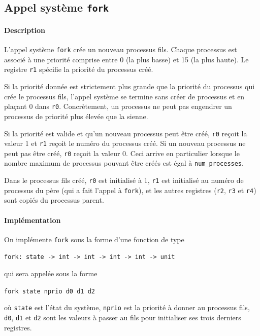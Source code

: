 \documentclass[french, toc]{../cs-classes/cs-classes}
\begin{document}
\subsection{Appel système \texttt{fork}}
\paragraph*{Description}
L'appel système \texttt{fork} crée un nouveau processus fils. Chaque processus est associé à une priorité comprise entre 0 (la plus basse) et 15 (la plus haute). Le registre \texttt{r1} spécifie la priorité du processus créé. 

Si la priorité donnée est strictement plus grande que la priorité du processus qui crée le processus fils, l’appel système se termine sans créer de processus et en plaçant 0 dans \texttt{r0}. Concrètement, un processus ne peut pas engendrer un processus de priorité plus élevée que la sienne. 

Si la priorité est valide et qu’un nouveau processus peut être créé, \texttt{r0} reçoit la valeur 1 et \texttt{r1} reçoit le numéro du processus créé. Si un nouveau processus ne peut pas être créé, \texttt{r0} reçoit la valeur 0. Ceci arrive en particulier lorsque le nombre maximum de processus pouvant être créés est égal à \texttt{num\_processes}.

Dans le processus ﬁls créé, \texttt{r0} est initialisé à 1, \texttt{r1} est initialisé au numéro de processus du père (qui a fait l’appel à \texttt{fork}), et les autres registres (\texttt{r2}, \texttt{r3} et \texttt{r4}) sont copiés du processus parent.

\paragraph*{Implémentation} On implémente \texttt{fork} sous la forme d'une fonction de type
\begin{center}
    \texttt{fork: state -> int -> int -> int -> int -> unit}
\end{center}
qui sera appelée sous la forme
\begin{center}
    \texttt{fork state nprio d0 d1 d2}
\end{center}
où \texttt{state} est l'état du système, \texttt{nprio} est la priorité à donner au processus fils, \texttt{d0}, \texttt{d1} et \texttt{d2} sont les valeurs à passer au fils pour initialiser ses trois derniers registres.
\end{document}
